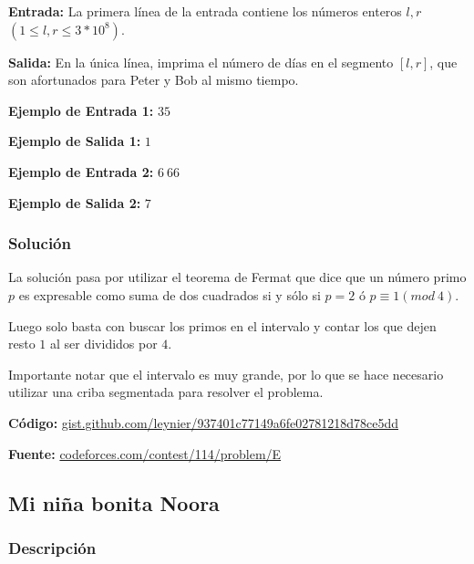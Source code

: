 \documentclass[12pt]{article}
\newcommand{\nl}{\vspace{0.3cm}}
\begin{document}
\nl

\textbf{Entrada:} La primera línea de la entrada contiene los números enteros $l, r$ $(1 \leqslant l, r \leqslant 3 * 10^8)$.

\nl

\textbf{Salida:} En la única línea, imprima el número de días en el segmento $[l, r]$, que son afortunados para Peter y Bob al mismo tiempo.

\nl

\textbf{Ejemplo de Entrada 1:} $3 5$

\nl

\textbf{Ejemplo de Salida 1:} $1$

\nl

\textbf{Ejemplo de Entrada 2:} $6\ 66$

\nl

\textbf{Ejemplo de Salida 2:} $7$

\nl

\subsubsection{Solución}

La solución pasa por utilizar el teorema de Fermat\cite{oftst} que dice que un número primo $p$ es expresable como suma de dos cuadrados si y sólo si $p = 2$ ó $p \equiv 1 (mod\ 4)$.

\nl

Luego solo basta con buscar los primos en el intervalo y contar los que dejen resto $1$ al ser divididos por $4$.

\nl

Importante notar que el intervalo es muy grande, por lo que se hace necesario utilizar una criba segmentada para resolver el problema.

\nl

\textbf{Código:} \href{https://gist.github.com/leynier/937401c77149a6fe02781218d78ce5dd}{gist.github.com/leynier/937401c77149a6fe02781218d78ce5dd}

\nl

\textbf{Fuente:} \href{https://codeforces.com/contest/114/problem/E}{codeforces.com/contest/114/problem/E}

\subsection{Mi niña bonita Noora}

\subsubsection{Descripción}
\end{document}
